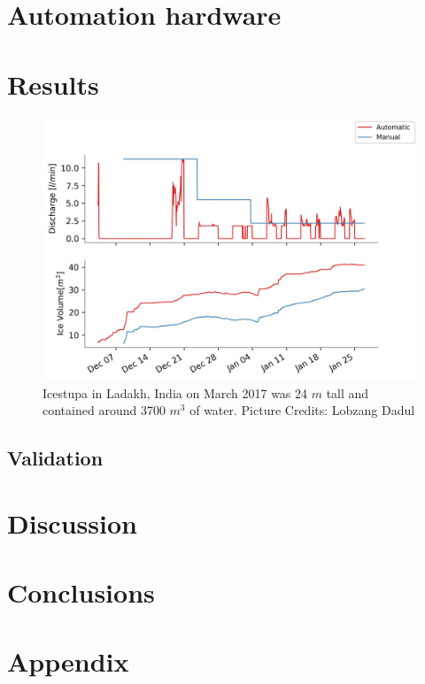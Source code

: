 \documentclass[utf8]{frontiersSCNS}
\begin{document}
\section{Automation hardware}

\section{Results}

\begin{figure}
	\begin{center}
		\includegraphics[width=\linewidth]{Figures/autovsmanual.jpg}
	\end{center}
	\caption{Icestupa in Ladakh, India on March 2017 was 24 $m$ tall and contained around 3700 $m^3$
		of water. Picture Credits: Lobzang Dadul}
	\label{fig:old_icestupa}
\end{figure}

\subsection{Validation}

\section{Discussion}

\section{Conclusions}

\section{Appendix}

 
\end{document}
